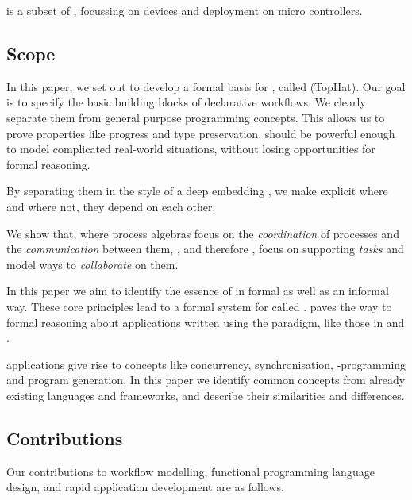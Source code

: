 \MTASKS is a subset of \ITASKS,
focussing on \IOT devices and deployment on micro controllers.




\subsection{Scope}

In this paper, we set out to develop a formal basis for \TOP, called \TOPHAT (TopHat).
Our goal is to specify the basic building blocks of declarative workflows.
We clearly separate them from general purpose programming concepts.
This allows us to prove properties like progress and type preservation.
\TOPHAT should be powerful enough to model complicated real-world situations,
without losing opportunities for formal reasoning.

By separating them in the style of a deep embedding \cite{conf/cefp/Gibbons13}, we make explicit where and where not, they depend on each other. 

We show that, where process algebras focus on the \emph{coordination} of processes and the \emph{communication} between them,
\TOP, and therefore \TOPHAT, focus on supporting \emph{tasks} and model ways to \emph{collaborate} on them.

In this paper we aim to identify the essence of \TOP in formal as well as an informal way.
These core principles lead to a formal system for \TOP called \TOPHAT.
\TOPHAT paves the way to formal reasoning about applications written using the \TOP paradigm,
like those in \ITASKS and \MTASKS.

\TOP applications give rise to concepts like concurrency, synchronisation, \GUI-programming and program generation.
In this paper we identify common concepts from already existing languages and frameworks,
and describe their similarities and differences.




\subsection{Contributions}

Our contributions to workflow modelling, functional programming language design, and rapid application development are as follows.


